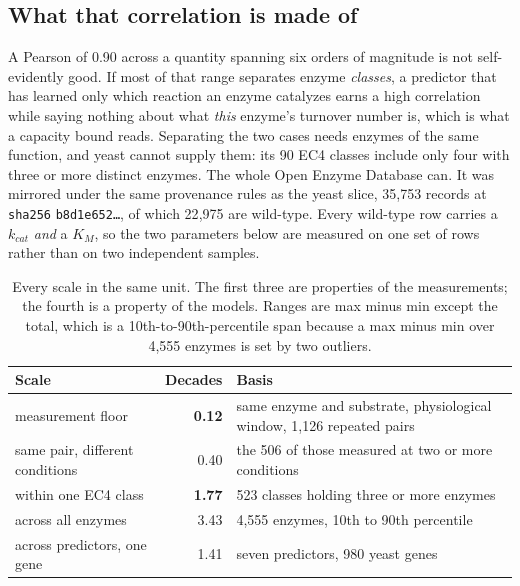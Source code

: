 \subsection{What that correlation is made of}
\label{sec:ec-class}

A Pearson of 0.90 across a quantity spanning six orders of magnitude is not self-evidently
good. If most of that range separates enzyme \emph{classes}, a predictor that has learned
only which reaction an enzyme catalyzes earns a high correlation while saying nothing about
what \emph{this} enzyme's turnover number is, which is what a capacity bound reads.
Separating the two cases needs enzymes of the same function, and yeast cannot supply them:
its 90 EC4 classes include only four with three or more distinct enzymes. The whole Open Enzyme Database can. It was mirrored under the same provenance
rules as the yeast slice, 35{,}753 records at \texttt{sha256}
\texttt{b8d1e652\dots}, of which 22{,}975 are wild-type. Every wild-type row carries a
$k_{cat}$ \emph{and} a $K_M$, so the two parameters below are measured on one set of rows
rather than on two independent samples.

\begin{table}[!htbp]
  \centering
  \footnotesize
  \caption[Scales of variation]{Every scale in the same unit. The first three are
  properties of the measurements; the fourth is a property of the models. Ranges are
  max minus min except the total, which is a 10th-to-90th-percentile span because a
  max minus min over 4{,}555 enzymes is set by two outliers.}
  \label{tab:scales}
  \begin{tabular}{@{}lrl@{}}
    \hline
    Scale & Decades & Basis \\
    \hline
    measurement floor & \textbf{0.12} & same enzyme and substrate, physiological window,
      1{,}126 repeated pairs \\
    same pair, different conditions & 0.40 & the 506 of those measured at two or more
      conditions \\
    within one EC4 class & \textbf{1.77} & 523 classes holding three or more enzymes \\
    across all enzymes & 3.43 & 4{,}555 enzymes, 10th to 90th percentile \\
    across predictors, one gene & 1.41 & seven predictors, 980 yeast genes \\
    \hline
  \end{tabular}
\end{table}

